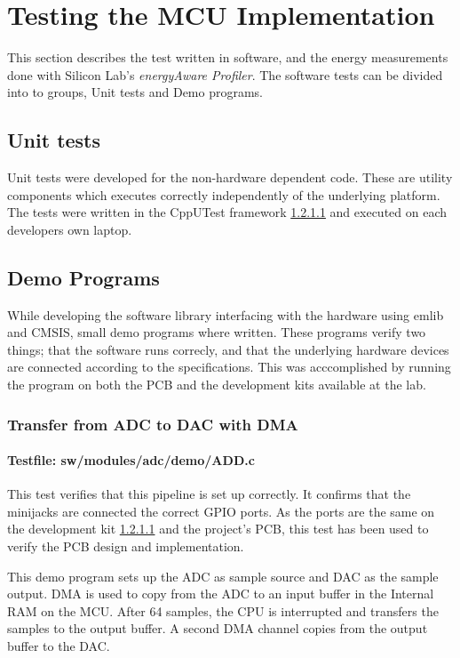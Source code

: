 \section{Testing the MCU Implementation}

This section describes the test written in software, and the energy measurements
done with Silicon Lab's \textit{energyAware Profiler}. The software tests can be
divided into to groups, Unit tests and Demo programs.

\subsection{Unit tests}

Unit tests were developed for the non-hardware dependent code. These are
utility components which executes correctly independently of the underlying
platform. The tests were written in the CppUTest framework \ref{} and executed
on each developers own laptop.

\subsection{Demo Programs}

While developing the software library interfacing with the hardware using emlib
and CMSIS, small demo programs where written. These programs verify two things;
that the software runs correcly, and that the underlying hardware devices are
connected according to the specifications. This was acccomplished by running the
program on both the PCB and the development kits available at the lab.

\subsubsection{Transfer from ADC to DAC with DMA}
\paragraph{Testfile: sw/modules/adc/demo/ADD.c}

This test verifies that this pipeline is set up correctly. It confirms that the minijacks
are connected the correct GPIO ports. As the ports are the same on the development kit \ref{}
and the project's PCB, this test has been used to verify the PCB design and implementation.

This demo program sets up the ADC as sample source and DAC as the sample output. DMA is
used to copy from the ADC to an input buffer in the Internal RAM on the MCU. After 64 samples,
the CPU is interrupted and transfers the samples to the output buffer. A second DMA channel
copies from the output buffer to the DAC.

